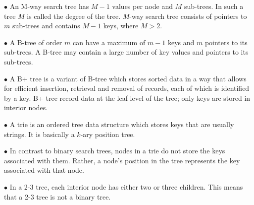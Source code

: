 \vskip 1mm
$\bullet$ An M-way search tree has $M-1$ values per node and $M$ sub-trees. In such a tree $M$ is called the degree of the tree. $M$-way search tree consists of pointers to $m$ sub-trees and contains $M-1$ keys, where $M>2$.

\vskip 3mm
$\bullet$ A B-tree of order $m$ can have a maximum of $m-1$ keys and $m$ pointers to its sub-trees. A B-tree may contain a large number of key values and pointers to its sub-trees.

\vskip 3mm
$\bullet$ A B+ tree is a variant of B-tree which stores sorted data in a way that allows for efficient insertion, retrieval and removal of records, each of which is identified by a key. B+ tree record data at the leaf level of the tree; only keys are stored in interior nodes.

\vskip 3mm
$\bullet$ A trie is an ordered tree data structure which stores keys that are usually strings. It is basically a $k$-ary position tree.

\vskip 3mm
$\bullet$ In contrast to binary search trees, nodes in a trie do not store the keys associated with them. Rather, a node's position in the tree represents the key associated with that node.

\vskip 3mm
$\bullet$ In a 2-3 tree, each interior node has either two or three children. This means that a 2-3 tree is not a binary tree.



\vfill\eject
\bye

